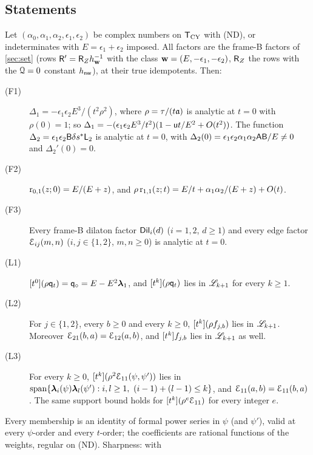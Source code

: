 \subsection{Statements}
\label{sec:lea-statements}

\begin{thm}
\label{thm:lea-main}
Let $(\alpha_0,\alpha_1,\alpha_2,\epsilon_1,\epsilon_2)$ be complex numbers on $\mathsf{T}_{\mathrm{CY}}$ with (ND), or indeterminates with $E = \epsilon_1+\epsilon_2$ imposed. All factors are the frame-B factors of \cref{sec:set} (rows $\mathsf{R}' = \mathsf{R}_{Z}h_{\mathbf{w}}^{-1}$ with the class $\mathbf{w} = (E,-\epsilon_1,-\epsilon_2)$, $\mathsf{R}_{Z}$ the rows with the $\mathcal{Q} = 0$ constant $h_{\mathsf{nw}}$), at their true idempotents. Then:
\begin{description}
\item[(F1)] $\Delta_1 = -\epsilon_1\epsilon_2E^3/(t^2\rho^2)$, where $\rho = \tau/(t\mathfrak{a})$ is analytic at $t = 0$ with $\rho(0) = 1$; so $\Delta_1 = -(\epsilon_1\epsilon_2E^3/t^2)(1 - \mathsf{u} t/E^2 + O(t^2))$. The function $\Delta_2 = \epsilon_1\epsilon_2\mathsf{B}\delta s^{\ast}\mathsf{L}_2$ is analytic at $t = 0$, with $\Delta_2(0) = \epsilon_1\epsilon_2\alpha_1\alpha_2\mathsf{A}\mathsf{B}/E \neq 0$ and $\Delta_2'(0) = 0$.
\item[(F2)] $\mathrm{r}_{0,1}(z;0) = E/(E+z)$, and $\rho\,\mathrm{r}_{1,1}(z;t) = E/t + \alpha_1\alpha_2/(E+z) + O(t)$.
\item[(F3)] Every frame-B dilaton factor $\mathsf{Dil}_i(d)$ ($i = 1,2$, $d \geq 1$) and every edge factor $\mathcal{E}_{ij}(m,n)$ ($i,j\in\{1,2\}$, $m,n\geq 0$) is analytic at $t = 0$.
\item[(L1)] $[t^0](\rho\mathsf{q}_{t}) = \mathsf{q}_{\circ} = E - E^2\boldsymbol{\lambda}_1$, and $[t^k](\rho\mathsf{q}_{t})$ lies in $\mathscr{L}_{k+1}$ for every $k\geq 1$.
\item[(L2)] For $j\in\{1,2\}$, every $b\geq 0$ and every $k\geq 0$, $[t^k](\rho f_{j,b})$ lies in $\mathscr{L}_{k+1}$. Moreover $\mathcal{E}_{21}(b,a) = \mathcal{E}_{12}(a,b)$, and $[t^k]f_{j,b}$ lies in $\mathscr{L}_{k+1}$ as well.
\item[(L3)] For every $k\geq 0$, $[t^k](\rho^2\mathcal{E}_{11}(\psi,\psi'))$ lies in $\operatorname{span}\{\boldsymbol{\lambda}_i(\psi)\boldsymbol{\lambda}_l(\psi') : i,l\geq 1,\ (i-1)+(l-1)\leq k\}$, and $\mathcal{E}_{11}(a,b) = \mathcal{E}_{11}(b,a)$. The same support bound holds for $[t^k](\rho^e\mathcal{E}_{11})$ for every integer $e$.
\end{description}
Every membership is an identity of formal power series in $\psi$ (and $\psi'$), valid at every $\psi$-order and every $t$-order; the coefficients are rational functions of the weights, regular on (ND). Sharpness: with

\end{thm}
